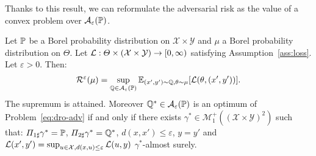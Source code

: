 Thanks to this result, we can reformulate the adversarial risk as the value of a convex problem over $\mathcal{A}_\varepsilon(\mathbb{P})$. %
\begin{prop} 
\label{prop:dro_adv}
Let $\mathbb{P}$ be a Borel probability distribution on $\mathcal{X}\times\mathcal{Y}$ and $\mu$ a Borel probability distribution on $\Theta$. Let $\mathcal{L}:\Theta\times(\mathcal{X}\times\mathcal{Y})\to [0,\infty)$ satisfying Assumption~\ref{ass:loss}. Let $\varepsilon>0$. Then:
\begin{align}
\label{eq:dro-adv}
\risk^\varepsilon(\mu)= \sup_{\QQ\in \mathcal{A}_{\varepsilon}(\PP)}\mathbb{E}_{(x',y')\sim\QQ,\theta\sim\mu}\left[\loss(\theta,(x',y'))\right].
\end{align}
The supremum is attained. Moreover $\mathbb{Q}^*\in \mathcal{A}_{\varepsilon}(\mathbb{P})$ is an optimum of Problem~\eqref{eq:dro-adv} if and only if there exists $\gamma^*\in\mathcal{M}^+_1\left((\mathcal{X}\times\mathcal{Y})^2\right)$ such that: $\Pi_{1\sharp}\gamma^*=\mathbb{P}$, $\Pi_{2\sharp}\gamma^*=\mathbb{Q}^*$, $d(x,x')\leq\varepsilon$, $y=y'$ and  $\mathcal{L}(x',y')=\sup_{\substack{u\in\mathcal{X},d(x,u)\leq\varepsilon}}\mathcal{L}(u,y)$ $\gamma^*$-almost surely.
\end{prop}

